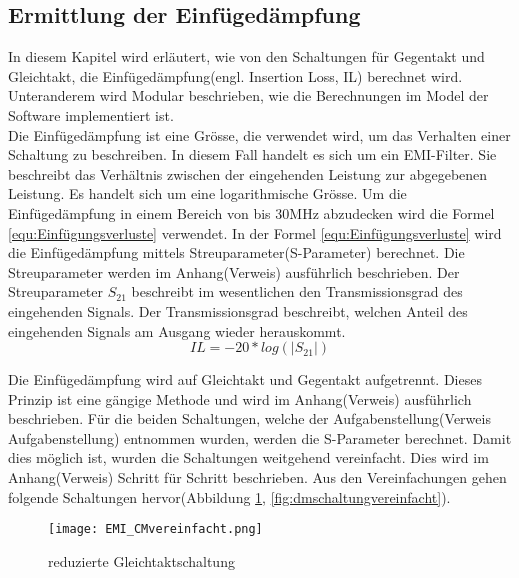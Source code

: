 \subsection{Ermittlung der Einfügedämpfung} \label{subsec:ermittlung}
In diesem Kapitel wird erläutert, wie von den Schaltungen für Gegentakt und Gleichtakt, die Einfügedämpfung(engl. Insertion Loss, IL) berechnet wird. Unteranderem wird Modular beschrieben, wie die Berechnungen im Model der Software implementiert ist. \\

Die Einfügedämpfung ist eine Grösse, die verwendet wird, um das Verhalten einer Schaltung zu beschreiben. In diesem Fall handelt es sich um ein EMI-Filter. Sie beschreibt das Verhältnis zwischen der eingehenden Leistung zur abgegebenen Leistung. Es handelt sich um eine logarithmische Grösse. Um die Einfügedämpfung in einem Bereich von bis 30MHz abzudecken wird die Formel \ref{equ:Einfügungsverluste} verwendet. In der Formel \ref{equ:Einfügungsverluste} wird die Einfügedämpfung mittels Streuparameter(S-Parameter) berechnet. Die Streuparameter werden im Anhang(Verweis) ausführlich beschrieben. Der Streuparameter $S_{21}$ beschreibt im wesentlichen den Transmissionsgrad des eingehenden Signals. Der Transmissionsgrad beschreibt, welchen Anteil des eingehenden Signals am Ausgang wieder herauskommt.\\

\begin{equation}\label{equ:Einfügungsverluste}
	IL = -20*log (\left\lvert S_{21} \right\rvert)
\end{equation}

Die Einfügedämpfung wird auf Gleichtakt und Gegentakt aufgetrennt. Dieses Prinzip ist eine gängige Methode und wird im Anhang(Verweis) ausführlich beschrieben. Für die beiden Schaltungen, welche der Aufgabenstellung(Verweis Aufgabenstellung) entnommen wurden, werden die S-Parameter berechnet. Damit dies möglich ist, wurden die Schaltungen weitgehend vereinfacht. Dies wird im Anhang(Verweis) Schritt für Schritt beschrieben. Aus den Vereinfachungen gehen folgende Schaltungen hervor(Abbildung \ref{fig:cmschaltungvereinfacht}, \ref{fig:dmschaltungvereinfacht}).

\begin{figure}[H]
		\centering
		\texttt{[image: EMI\_CMvereinfacht.png]}
		\label{fig:cmschaltungvereinfacht}
		\caption{reduzierte Gleichtaktschaltung}
\end{figure}

